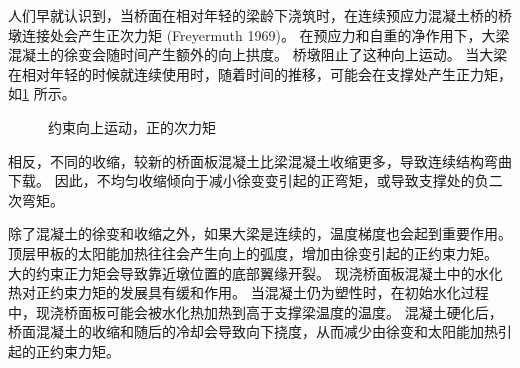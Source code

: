 人们早就认识到，当桥面在相对年轻的梁龄下浇筑时，在连续预应力混凝土桥的桥墩连接处会产生正次力矩 (Freyermuth 1969)。 在预应力和自重的净作用下，大梁混凝土的徐变会随时间产生额外的向上拱度。 桥墩阻止了这种向上运动。 当大梁在相对年轻的时候就连续使用时，随着时间的推移，可能会在支撑处产生正力矩，如\cref{fig:positive-secondary-moment} 所示。

\begin{figure}
  \caption{约束向上运动，正的次力矩}
  \label{fig:positive-secondary-moment}
\end{figure}

相反，不同的收缩，较新的桥面板混凝土比梁混凝土收缩更多，导致连续结构弯曲下载。 因此，不均匀收缩倾向于减小徐变变引起的正弯矩，或导致支撑处的负二次弯矩。

除了混凝土的徐变和收缩之外，如果大梁是连续的，温度梯度也会起到重要作用。 顶层甲板的太阳能加热往往会产生向上的弧度，增加由徐变引起的正约束力矩。 大的约束正力矩会导致靠近墩位置的底部翼缘开裂。 现浇桥面板混凝土中的水化热对正约束力矩的发展具有缓和作用。 当混凝土仍为塑性时，在初始水化过程中，现浇桥面板可能会被水化热加热到高于支撑梁温度的温度。 混凝土硬化后，桥面混凝土的收缩和随后的冷却会导致向下挠度，从而减少由徐变和太阳能加热引起的正约束力矩。

